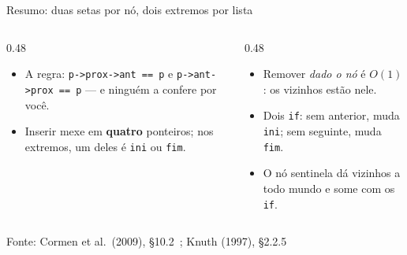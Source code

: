 \documentclass[aspectratio=169]{beamer}
\newcommand{\fonte}[1]{\vfill\hfill{\scriptsize\textcolor{UFSGray}{Fonte: #1}}}
\begin{document}
\begin{frame}{Resumo: duas setas por nó, dois extremos por lista}
  \begin{center}
  \end{center}
  \begin{columns}[T]
    \begin{column}{0.48\textwidth}
      \small
      \begin{itemize}
        \item A regra: \texttt{p->prox->ant == p} e \texttt{p->ant->prox ==
          p} --- e ninguém a confere por você.
        \item Inserir mexe em \textbf{quatro} ponteiros; nos extremos, um
          deles é \texttt{ini} ou \texttt{fim}.
      \end{itemize}
    \end{column}
    \begin{column}{0.48\textwidth}
      \small
      \begin{itemize}
        \item Remover \emph{dado o nó} é $O(1)$: os vizinhos estão nele.
        \item Dois \texttt{if}: sem anterior, muda \texttt{ini}; sem
          seguinte, muda \texttt{fim}.
        \item O nó sentinela dá vizinhos a todo mundo e some com os
          \texttt{if}.
      \end{itemize}
    \end{column}
  \end{columns}
  \fonte{Cormen et al.\ (2009), §10.2~\cite{cormen2009introduction}; Knuth (1997), §2.2.5~\cite{knuth1997art}}
\end{frame}
\end{document}

